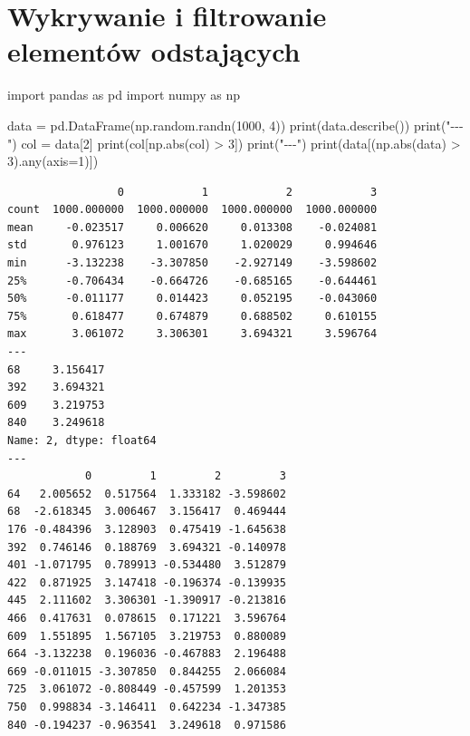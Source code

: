 \documentclass[
  polish,
  letterpaper,
  DIV=11,
  numbers=noendperiod]{scrreprt}
\newenvironment{Shaded}{\begin{snugshade}}{\end{snugshade}}
\newcommand{\BuiltInTok}[1]{\textcolor[rgb]{0.00,0.23,0.31}{#1}}
\newcommand{\DecValTok}[1]{\textcolor[rgb]{0.68,0.00,0.00}{#1}}
\newcommand{\ImportTok}[1]{\textcolor[rgb]{0.00,0.46,0.62}{#1}}
\newcommand{\NormalTok}[1]{\textcolor[rgb]{0.00,0.23,0.31}{#1}}
\newcommand{\OperatorTok}[1]{\textcolor[rgb]{0.37,0.37,0.37}{#1}}
\newcommand{\StringTok}[1]{\textcolor[rgb]{0.13,0.47,0.30}{#1}}
\begin{document}
\section{Wykrywanie i filtrowanie elementów
odstających}\label{wykrywanie-i-filtrowanie-elementuxf3w-odstajux105cych}

\begin{Shaded}
\begin{Highlighting}[]
\ImportTok{import}\NormalTok{ pandas }\ImportTok{as}\NormalTok{ pd}
\ImportTok{import}\NormalTok{ numpy }\ImportTok{as}\NormalTok{ np}

\NormalTok{data }\OperatorTok{=}\NormalTok{ pd.DataFrame(np.random.randn(}\DecValTok{1000}\NormalTok{, }\DecValTok{4}\NormalTok{))}
\BuiltInTok{print}\NormalTok{(data.describe())}
\BuiltInTok{print}\NormalTok{(}\StringTok{"{-}{-}{-}"}\NormalTok{)}
\NormalTok{col }\OperatorTok{=}\NormalTok{ data[}\DecValTok{2}\NormalTok{]}
\BuiltInTok{print}\NormalTok{(col[np.}\BuiltInTok{abs}\NormalTok{(col) }\OperatorTok{\textgreater{}} \DecValTok{3}\NormalTok{])}
\BuiltInTok{print}\NormalTok{(}\StringTok{"{-}{-}{-}"}\NormalTok{)}
\BuiltInTok{print}\NormalTok{(data[(np.}\BuiltInTok{abs}\NormalTok{(data) }\OperatorTok{\textgreater{}} \DecValTok{3}\NormalTok{).}\BuiltInTok{any}\NormalTok{(axis}\OperatorTok{=}\DecValTok{1}\NormalTok{)])}
\end{Highlighting}
\end{Shaded}

\begin{verbatim}
                 0            1            2            3
count  1000.000000  1000.000000  1000.000000  1000.000000
mean     -0.023517     0.006620     0.013308    -0.024081
std       0.976123     1.001670     1.020029     0.994646
min      -3.132238    -3.307850    -2.927149    -3.598602
25%      -0.706434    -0.664726    -0.685165    -0.644461
50%      -0.011177     0.014423     0.052195    -0.043060
75%       0.618477     0.674879     0.688502     0.610155
max       3.061072     3.306301     3.694321     3.596764
---
68     3.156417
392    3.694321
609    3.219753
840    3.249618
Name: 2, dtype: float64
---
            0         1         2         3
64   2.005652  0.517564  1.333182 -3.598602
68  -2.618345  3.006467  3.156417  0.469444
176 -0.484396  3.128903  0.475419 -1.645638
392  0.746146  0.188769  3.694321 -0.140978
401 -1.071795  0.789913 -0.534480  3.512879
422  0.871925  3.147418 -0.196374 -0.139935
445  2.111602  3.306301 -1.390917 -0.213816
466  0.417631  0.078615  0.171221  3.596764
609  1.551895  1.567105  3.219753  0.880089
664 -3.132238  0.196036 -0.467883  2.196488
669 -0.011015 -3.307850  0.844255  2.066084
725  3.061072 -0.808449 -0.457599  1.201353
750  0.998834 -3.146411  0.642234 -1.347385
840 -0.194237 -0.963541  3.249618  0.971586
\end{verbatim}
\end{document}
